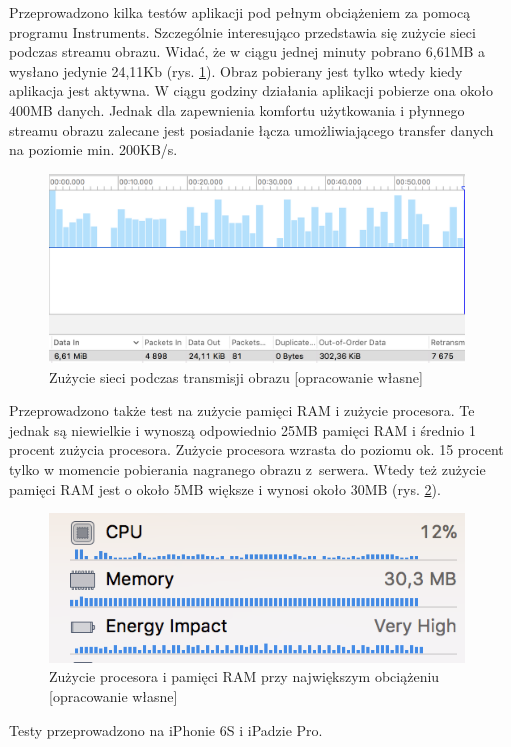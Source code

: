 \documentclass[polish,bachelor,a4paper,oneside]{ppfcmthesis}
\begin{document}
    Przeprowadzono kilka testów aplikacji pod pełnym obciążeniem za pomocą programu Instruments. Szczególnie interesująco przedstawia się zużycie sieci podczas streamu obrazu. Widać, że w ciągu jednej minuty pobrano 6,61MB a wysłano jedynie 24,11Kb (rys. \ref{netuse}). Obraz pobierany jest tylko wtedy kiedy aplikacja jest aktywna. W ciągu godziny działania aplikacji pobierze ona około 400MB danych. Jednak dla zapewnienia komfortu użytkowania i płynnego streamu obrazu zalecane jest posiadanie łącza umożliwiającego transfer danych na poziomie min. 200KB/s.
    \begin{figure}[H]
        \centering
        \includegraphics[width=11cm]{ios_screenshots/networkUsage.png}
        \caption{Zużycie sieci podczas transmisji obrazu [opracowanie własne]}
        \label{netuse}
    \end{figure}
    Przeprowadzono także test na zużycie pamięci RAM i zużycie procesora. Te jednak są niewielkie i wynoszą odpowiednio 25MB pamięci RAM i średnio 1 procent zużycia procesora.
    Zużycie procesora wzrasta do poziomu ok. 15 procent tylko w momencie pobierania nagranego obrazu z~serwera. Wtedy też zużycie pamięci RAM jest o około 5MB większe i wynosi około 30MB (rys. \ref{cpuram}).
    \begin{figure}[H]
        \centering
        \includegraphics[width=11cm]{ios_screenshots/CPURAM.png}
        \caption{Zużycie procesora i pamięci RAM przy największym obciążeniu [opracowanie własne]}
        \label{cpuram}
    \end{figure}
    Testy przeprowadzono na iPhonie 6S i iPadzie Pro.
\end{document}

